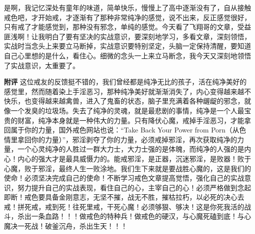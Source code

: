 \begin{case}
    是啊，我记忆深处有童年的味道，简单快乐，慢慢上了高中逐渐没有了，自从接触戒色吧，才开始戒，才逐渐有了那种非常纯净的感觉，说不出来，反正感觉很好，只有戒了才能感觉到，那种没有邪念，单纯的感觉。今天看了飞翔哥的文章，受益匪浅啊！让我明白了要有坚决的实战意识，要深刻地学习，多看文章，深刻领悟，实战时当念头上来要立马断掉，实战意识要特别坚定，头脑一定保持清醒，要知道自己心里想的是什么，看住心。细微的念头一上来立马断念，我今天又深刻地领悟了实战意识，太重要了。

    \textbf{附评} 这位戒友的反馈挺不错的，我们曾经都是纯净无比的孩子，活在纯净美好的感觉里，然而随着染上手淫恶习，那种纯净美好就渐渐消失了，内心变得越来越不快乐，也变得越来越禽兽，进入了鬼畜的状态，脑子里充满着各种龌龊的邪念，就像一个发臭的垃圾场。失去了纯净的灵魂，就是最悲剧的事情，纯净是一个人最宝贵的财富，纯净本身就是一种伟大的力量。只有降伏心魔，戒掉手淫恶习，才能拿回属于你的力量，国外戒色网站也说：“Take Back Your Power from Porn（从色情里拿回你的力量）”，邪淫剥夺了你的力量，必须戒掉邪淫，再次获取纯净的力量，一个心灵纯净的人胜过一群大力士，大力士强的是体魄，而纯净的人强的是内心！内心的强大才是最具威慑力的。能戒邪淫，是正器，沉迷邪淫，是败器！败于心魔，败于邪淫，最终人生一败涂地。我们生下来就是要战胜心魔的，这是我们的使命！必须坚决完成自己的使命！不断学习戒色文章提高觉悟，强化自己的实战意识，努力提升自己的实战表现，看住自己的心，主宰自己的心！必须严格做到念起即断！戒色要具备金刚意志，无坚不摧，战无不胜，摧枯拉朽，以必死的决心去戒！拼死戒，戒到死！往死里戒，干死心魔！必须够狠、够决！这是你死我活的战斗，杀出一条血路！！！做戒色的特种兵！做戒色的硬汉，与心魔死磕到底！与心魔决一死战！破釜沉舟，杀出生天！！！
\end{case}

